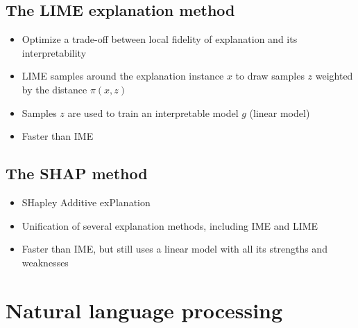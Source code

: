 \documentclass{article}
\begin{document}
    \subsection{The LIME explanation method}
    \begin{itemize}
        \item Optimize a trade-off between local fidelity of explanation and its interpretability
        \item LIME samples around the explanation instance $x$ to draw samples $z$ weighted by the distance $\pi(x, z)$
        \item Samples $z$ are used to train an interpretable model $g$ (linear model)
        \item Faster than IME
    \end{itemize}

    \subsection{The SHAP method}
    \begin{itemize}
        \item SHapley Additive exPlanation
        \item Unification of several explanation methods, including IME and LIME
        \item Faster than IME, but still uses a linear model with all its strengths and weaknesses
    \end{itemize}

    \newpage

\section{Natural language processing}
\end{document}
